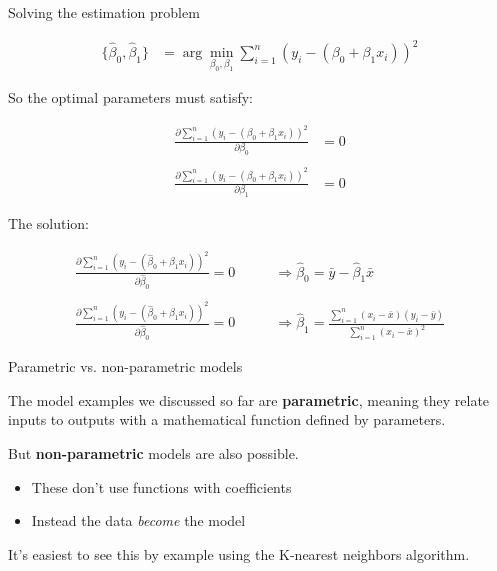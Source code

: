 \documentclass[aspectratio=169]{beamer}
\begin{document}
\begin{frame}{Solving the estimation problem}

\begin{align*}
\{\hat{\beta}_0, \hat{\beta}_1\} &= \arg \min_{\beta_0,\beta_1} \sum_{i=1}^n (y_i - (\beta_0 + \beta_1 x_i))^2
\end{align*}

So the optimal parameters must satisfy:

\begin{align*}
\frac{\partial \sum_{i=1}^n (y_i - (\beta_0 + \beta_1 x_i))^2}{\partial \beta_0} &= 0\\\\
\frac{\partial  \sum_{i=1}^n(y_i - (\beta_0 + \beta_1 x_i))^2}{\partial \beta_1} &= 0
\end{align*}
\end{frame}

\begin{frame}{The solution: }

\begin{align*}
\frac{\partial  \sum_{i=1}^n(y_i - (\hat{\beta}_0 + \hat{\beta}_1 x_i))^2}{\partial \hat{\beta}_0} = 0 \quad\quad &\Rightarrow \hat{\beta}_0  =\bar{y} - \hat{\beta}_1\bar{x}\\\\
\frac{\partial   \sum_{i=1}^n(y_i - (\hat{\beta}_0 + \hat{\beta}_1 x_i))^2}{\partial \hat{\beta}_0} = 0 \quad\quad &\Rightarrow 
\hat{\beta}_1 = \frac{ \sum_{i=1}^n(x_i-\bar{x})(y_i-\bar{y})}{\sum_{i=1}^n (x_i-\bar{x})^2}
\end{align*}

\end{frame}

\begin{frame}{Parametric vs. non-parametric models}

The model examples we discussed so far are \textbf{parametric}, meaning they relate inputs to outputs with a mathematical function defined by parameters.  

\vspace{5mm}

But \textbf{non-parametric} models are also possible.  
\begin{itemize}
\item These don't use functions with coefficients
\item Instead the data \textit{become} the model
\end{itemize}

\vspace{5mm}

It's easiest to see this by example using the K-nearest neighbors algorithm.

\end{frame}
\end{document}
